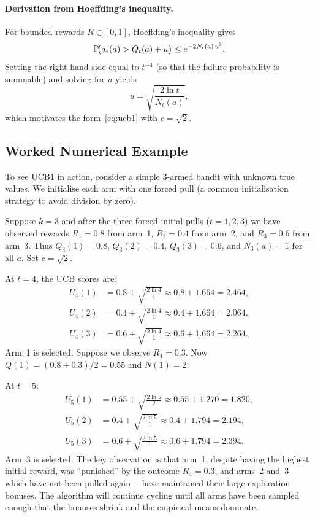 \paragraph{Derivation from Hoeffding's inequality.}
For bounded rewards $R\in[0,1]$, Hoeffding's inequality gives
\[
\mathbb{P}\!\big(q_*(a) > Q_t(a) + u\big) \le e^{-2N_t(a)\,u^2}.
\]
Setting the right-hand side equal to $t^{-4}$ (so that the failure probability is summable) and solving for $u$ yields
\[
u = \sqrt{\frac{2\ln t}{N_t(a)}},
\]
which motivates the form~\eqref{eq:ucb1} with $c=\sqrt{2}$.

\subsection*{Worked Numerical Example}

To see UCB1 in action, consider a simple $3$-armed bandit with unknown true values.  We initialise each arm with one forced pull (a common initialisation strategy to avoid division by zero).

\begin{example}
\label{ex:ucb1-trace}
Suppose $k=3$ and after the three forced initial pulls ($t=1,2,3$) we have observed rewards $R_1=0.8$ from arm~1, $R_2=0.4$ from arm~2, and $R_3=0.6$ from arm~3.  Thus $Q_3(1)=0.8$, $Q_3(2)=0.4$, $Q_3(3)=0.6$, and $N_3(a)=1$ for all $a$.  Set $c=\sqrt{2}$.

At $t=4$, the UCB scores are:
\begin{align*}
U_4(1) &= 0.8 + \sqrt{\tfrac{2\ln 4}{1}} \approx 0.8 + 1.664 = 2.464,\\
U_4(2) &= 0.4 + \sqrt{\tfrac{2\ln 4}{1}} \approx 0.4 + 1.664 = 2.064,\\
U_4(3) &= 0.6 + \sqrt{\tfrac{2\ln 4}{1}} \approx 0.6 + 1.664 = 2.264.
\end{align*}
Arm~1 is selected.  Suppose we observe $R_4=0.3$.  Now $Q(1)=(0.8+0.3)/2=0.55$ and $N(1)=2$.

At $t=5$:
\begin{align*}
U_5(1) &= 0.55 + \sqrt{\tfrac{2\ln 5}{2}} \approx 0.55 + 1.270 = 1.820,\\
U_5(2) &= 0.4 + \sqrt{\tfrac{2\ln 5}{1}} \approx 0.4 + 1.794 = 2.194,\\
U_5(3) &= 0.6 + \sqrt{\tfrac{2\ln 5}{1}} \approx 0.6 + 1.794 = 2.394.
\end{align*}
Arm~3 is selected.  The key observation is that arm~1, despite having the highest initial reward, was ``punished'' by the outcome $R_4=0.3$, and arms~2 and~3\,---\,which have not been pulled again\,---\,have maintained their large exploration bonuses.  The algorithm will continue cycling until all arms have been sampled enough that the bonuses shrink and the empirical means dominate.
\end{example}

